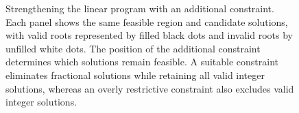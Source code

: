 \begin{figure}[ht]
    \caption{Strengthening the linear program with an additional constraint. Each panel shows the same feasible region and candidate solutions, with valid roots represented by filled black dots and invalid roots by unfilled white dots. The position of the additional constraint determines which solutions remain feasible. A suitable constraint eliminates fractional solutions while retaining all valid integer solutions, whereas an overly restrictive constraint also excludes valid integer solutions.}
    \label{fig::LP_strengthening}
\end{figure}